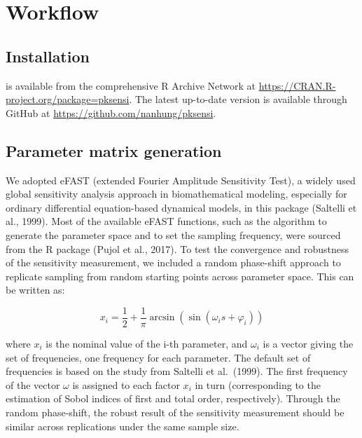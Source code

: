 \documentclass[article]{jss}
\begin{document}
\hypertarget{workflow}{%
\section{Workflow}\label{workflow}}

\hypertarget{installation}{%
\subsection{Installation}\label{installation}}

 is available from the comprehensive R Archive Network at
\url{https://CRAN.R-project.org/package=pksensi}. The latest up-to-date
version is available through GitHub at
\url{https://github.com/nanhung/pksensi}.

\hypertarget{parameter-matrix-generation}{%
\subsection{Parameter matrix
generation}\label{parameter-matrix-generation}}

We adopted eFAST (extended Fourier Amplitude Sensitivity Test), a widely
used global sensitivity analysis approach in biomathematical modeling,
especially for ordinary differential equation-based dynamical models, in
this package (Saltelli et al., 1999). Most of the available eFAST
functions, such as the algorithm to generate the parameter space and to
set the sampling frequency, were sourced from the R 
package (Pujol et al., 2017). To test the convergence and robustness of
the sensitivity measurement, we included a random phase-shift approach
to replicate sampling from random starting points across parameter
space. This can be written as:

\[ x_i = \frac{1}{2} + \frac{1}{\pi}\arcsin(\sin(\omega_is + \varphi_i)) \]

where \(x_i\) is the nominal value of the i-th parameter, and
\(\omega_i\) is a vector giving the set of frequencies, one frequency
for each parameter. The default set of frequencies is based on the study
from Saltelli et al.~(1999). The first frequency of the vector
\(\omega\) is assigned to each factor \(x_i\) in turn (corresponding to
the estimation of Sobol indices of first and total order, respectively).
Through the random phase-shift, the robust result of the sensitivity
measurement should be similar across replications under the same sample
size.
\end{document}
